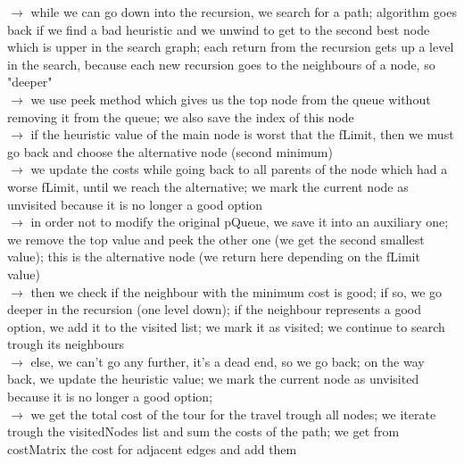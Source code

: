 \documentclass[12pt, a4paper]{article}
\begin{document}
\begin{flushleft}
\hspace{3mm}$\rightarrow$ while we can go down into the recursion, we search for a path; algorithm goes back if we find a bad heuristic and we unwind to get to the second best node which is upper in the search graph; each return from the recursion gets up a level in the search, because each new recursion goes to the neighbours of a node, so "deeper"\\

\newpage
\hspace{3mm}$\rightarrow$ we use peek method which gives us the top node from the queue without removing it from the queue; we also save the index of this node\\

\hspace{3mm}$\rightarrow$ if the heuristic value of the main node is worst that the fLimit, then we must go back and choose the alternative node (second minimum)\\

\hspace{3mm}$\rightarrow$ we update the costs while going back to all parents of the node which had a worse fLimit, until we reach the alternative; we mark the current node as unvisited because it is no longer a good option\\

\hspace{3mm}$\rightarrow$ in order not to modify the original pQueue, we save it into an auxiliary one; we remove the top value and peek the other one (we get the second smallest value); this is the alternative node (we return here depending on the fLimit value)\\

\hspace{3mm}$\rightarrow$ then we check if the neighbour with the minimum cost is good; if so, we go deeper in the recursion (one level down); if the neighbour represents a good option, we add it to the visited list; we mark it as visited; we continue to search trough its neighbours\\

\hspace{3mm}$\rightarrow$ else, we can't go any further, it's a dead end, so we go back; on the way back, we update the heuristic value; we mark the current node as unvisited because it is no longer a good option; \\

\hspace{3mm}$\rightarrow$ we get the total cost of the tour for the travel trough all nodes; we iterate trough the visitedNodes list and sum the costs of the path; we get from costMatrix the cost for adjacent edges and add them\\
\end{flushleft}
\end{document}
